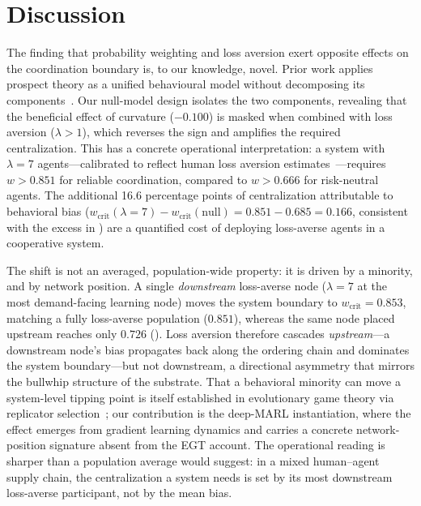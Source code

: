 \documentclass[11pt]{article}
\newcommand{\wcrit}{w_{\mathrm{crit}}}
\begin{document}
\section{Discussion}
\label{sec:discussion}

The finding that probability weighting and loss aversion exert opposite
effects on the coordination boundary is, to our knowledge, novel.
Prior work applies prospect theory as a unified behavioural model without
decomposing its components~\citep{lalmohammed2025,anon2024risk}.
Our null-model design isolates the two components, revealing that the
beneficial effect of curvature ($-0.100$) is masked when combined with
loss aversion ($\lambda{>}1$), which reverses the sign and amplifies the
required centralization.
This has a concrete operational interpretation: a system with $\lambda{=}7$
agents---calibrated to reflect human loss aversion
estimates~\citep{tversky1992}---requires $w > 0.851$ for reliable
coordination, compared to $w > 0.666$ for risk-neutral agents.
The additional 16.6 percentage points of centralization attributable to
behavioral bias ($\wcrit(\lambda{=}7) - \wcrit(\text{null}) =
0.851 - 0.685 = 0.166$, consistent with the excess in
) are a quantified cost of deploying loss-averse
agents in a cooperative system.

The shift is not an averaged, population-wide property: it is driven by a
minority, and by network position. A single \emph{downstream} loss-averse
node ($\lambda{=}7$ at the most demand-facing learning node) moves the
system boundary to $\wcrit = 0.853$, matching a fully loss-averse
population ($0.851$), whereas the same node placed upstream reaches only
$0.726$ (). Loss aversion therefore cascades
\emph{upstream}---a downstream node's bias propagates back along the
ordering chain and dominates the system boundary---but not downstream, a
directional asymmetry that mirrors the bullwhip structure of the substrate.
That a behavioral minority can move a system-level tipping point is itself
established in evolutionary game theory via replicator
selection~\citep{mengesha2025}; our contribution is the deep-MARL
instantiation, where the effect emerges from gradient learning dynamics and
carries a concrete network-position signature absent from the EGT account.
The operational reading is sharper than a population average would suggest:
in a mixed human--agent supply chain, the centralization a system needs is
set by its most downstream loss-averse participant, not by the mean bias.
\end{document}
